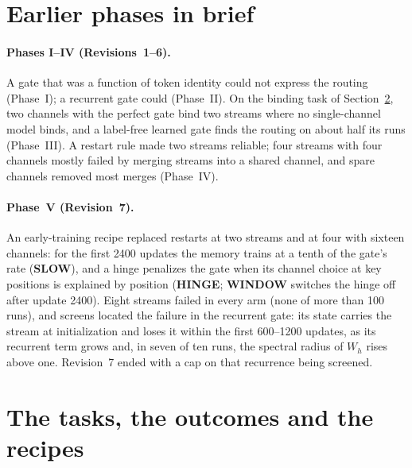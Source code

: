 \documentclass[11pt]{article}
\begin{document}
\section{Earlier phases in brief}
\label{sec:prior}

\paragraph{Phases I--IV (Revisions~1--6).} A gate that was a function of token identity could not express the routing (Phase~I); a recurrent gate could (Phase~II). On the binding task of Section~\ref{sec:task}, two channels with the perfect gate bind two streams where no single-channel model binds, and a label-free learned gate finds the routing on about half its runs (Phase~III). A restart rule made two streams reliable; four streams with four channels mostly failed by merging streams into a shared channel, and spare channels removed most merges (Phase~IV).

\paragraph{Phase~V (Revision~7).} An early-training recipe replaced restarts at two streams and at four with sixteen channels: for the first 2400 updates the memory trains at a tenth of the gate's rate (\textbf{SLOW}), and a hinge penalizes the gate when its channel choice at key positions is explained by position (\textbf{HINGE}; \textbf{WINDOW} switches the hinge off after update 2400). Eight streams failed in every arm (none of more than 100 runs), and screens located the failure in the recurrent gate: its state carries the stream at initialization and loses it within the first 600--1200 updates, as its recurrent term grows and, in seven of ten runs, the spectral radius of $W_h$ rises above one. Revision~7 ended with a cap on that recurrence being screened.

\section{The tasks, the outcomes and the recipes}
\label{sec:task}
\end{document}
